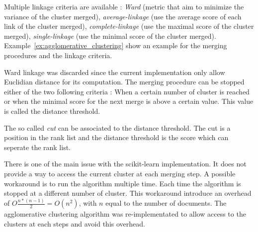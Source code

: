 Multiple linkage criteria are available : \textit{Ward} (metric that aim to minimize the variance of the cluster merged), \textit{average-linkage} (use the average score of each link of the cluster merged), \textit{complete-linkage} (use the maximal score of the cluster merged), \textit{single-linkage} (use the minimal score of the cluster merged).
Example~\ref{ex:agglomerative_clustering} show an example for the merging procedures and the linkage criteria.

Ward linkage was discarded since the current implementation only allow Euclidian distance for its computation.
The merging procedure can be stopped either of the two following criteria : When a certain number of cluster is reached or when the minimal score for the next merge is above a certain value.
This value is called the distance threshold.

The so called \textit{cut} can be associated to the distance threshold.
The cut is a position in the rank list and the distance threshold is the score which can seperate the rank list.

There is one of the main issue with the scikit-learn implementation.
It does not provide a way to access the current cluster at each merging step.
A possible workaround is to run the algorithm multiple time.
Each time the algorithm is stopped at a different number of cluster.
This workaround introduce an overhead of $O\frac{n * (n - 1)}{2} = O(n^2)$, with $n$ equal to the number of documents.
The agglomerative clustering algorithm was re-implementated to allow access to the clusters at each steps and avoid this overhead.

